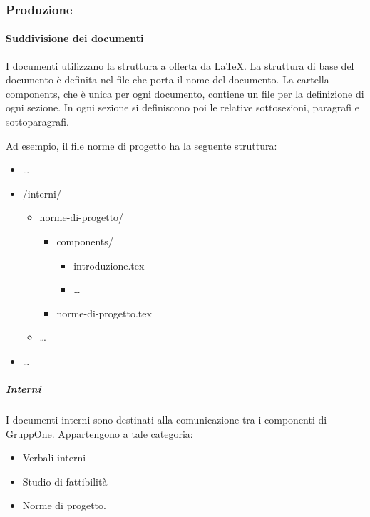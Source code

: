 \documentclass[../norme-di-progetto.tex]{subfiles}
\begin{document}
\subsubsection{Produzione}%
\label{subs:produzione}

\paragraph{Suddivisione dei documenti}%
\label{par:suddivisione_dei_documenti}
I documenti utilizzano la struttura a  offerta da \LaTeX.
La struttura di base del documento è definita nel file che porta il nome del documento.
La cartella components, che è unica per ogni documento, contiene un file per la definizione di ogni sezione. In ogni sezione si definiscono poi le relative sottosezioni, paragrafi e sottoparagrafi.

Ad esempio, il file norme di progetto ha la seguente struttura:

\begin{itemize}
  \item[] \ldots
  \item[] /interni/
        \begin{itemize}
          \item[] norme-di-progetto/
                \begin{itemize}
                  \item[] components/
                        \begin{itemize}
                          \item[] introduzione.tex
                          \item[] \ldots
                        \end{itemize}
                  \item[] norme-di-progetto.tex
                \end{itemize}
          \item[] \ldots
        \end{itemize}
  \item[] \ldots
\end{itemize}

\subparagraph{Interni}%
\label{subp:suddivisione_dei_documenti/interni}
I documenti interni sono destinati alla comunicazione tra i componenti di GruppOne. Appartengono a tale categoria:

\begin{itemize}
  \item Verbali interni
  \item Studio di fattibilità
  \item Norme di progetto.
\end{itemize}
\end{document}

